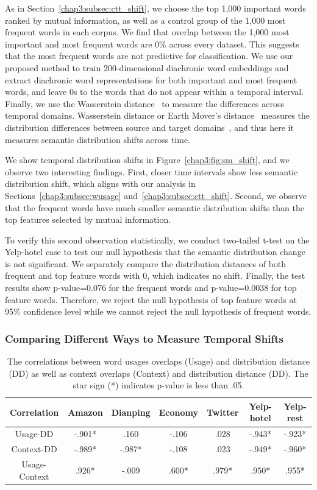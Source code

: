 As in Section~\ref{chap3:subsec:ctt_shift},
we choose the top 1,000 important words ranked by mutual information, as well as a control group of the 1,000 most frequent words in each corpus.  We find that overlap between the 1,000 most important and most frequent words are 0\% across every dataset. This suggests that the most frequent words are not predictive for classification. 
We use our proposed method to train 200-dimensional diachronic word embeddings and extract diachronic word representations for both important and most frequent words, and leave 0s to the words that do not appear within a temporal interval. 
Finally, we use the Wasserstein distance~\cite{shen2018wasserstein} to measure the differences across temporal domains.
Wasserstein distance or Earth Mover's distance~\cite{vallender1974calculation} measures the distribution differences between source and target domains~\cite{shen2018wasserstein},
and thus here it measures semantic distribution shifts across time. 

We show temporal distribution shifts in Figure~\ref{chap3:fig:sm_shift}, 
and we observe two interesting findings. 
First, closer time intervals show less semantic distribution shift, which aligns with our analysis in Sections~\ref{chap3:subsec:wusage} and~\ref{chap3:subsec:ctt_shift}. Second, we observe that the frequent words have much smaller semantic distribution shifts than the top features selected by mutual information. 

To verify this second observation statistically, we conduct two-tailed t-test on the Yelp-hotel case to test our null hypothesis that the semantic distribution change is not significant. We separately compare the distribution distances of both frequent and top feature words with 0, which indicates no shift. Finally, the test results show p-value=0.076 for the frequent words and p-value=0.0038 for top feature words. Therefore, we reject the null hypothesis of top feature words at 95\% confidence level while we cannot reject the null hypothesis of frequent words.


\subsubsection{Comparing Different Ways to Measure Temporal Shifts}

\begin{table}[ht]
\centering
\begin{tabular}{c||cccccc}
Correlation & Amazon  & Dianping & Economy & Twitter & Yelp-hotel & Yelp-rest \\\hline\hline
Usage-DD    & -.901* & .160    & -.106  & .028   & -.943*    & -.923*   \\
Context-DD  & -.989* & -.987*   & -.108  & .023   & -.949*    & -.960*  \\
Usage-Context  & .926* & -.009   & .600*  & .979*   & .950*    & .955*  
\end{tabular}
\caption{The correlations between word usages overlaps (Usage) and distribution distance (DD) as well as context overlaps (Context) and distribution distance (DD). The star sign (*) indicates p-value is less than .05.}
\label{chap3:tab:corr}
\end{table}

